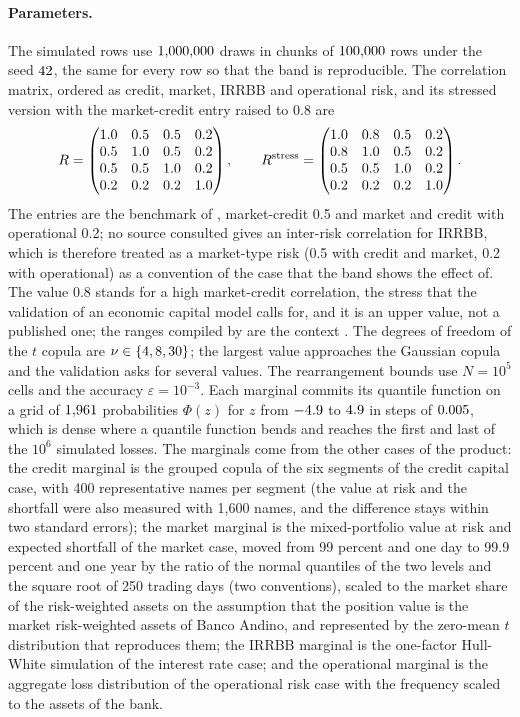 \paragraph{Parameters.}
The simulated rows use $1{,}000{,}000$ draws in chunks of $100{,}000$ rows under the seed $42$, the same for every row so
that the band is reproducible. The correlation matrix, ordered as credit, market, IRRBB and operational risk, and its stressed
version with the market-credit entry raised to 0.8 are
\begin{equation}
R=\begin{pmatrix} 1.0 & 0.5 & 0.5 & 0.2 \\ 0.5 & 1.0 & 0.5 & 0.2 \\ 0.5 & 0.5 & 1.0 & 0.2 \\ 0.2 & 0.2 & 0.2 & 1.0 \end{pmatrix},\qquad R^{\mathrm{stress}}=\begin{pmatrix} 1.0 & 0.8 & 0.5 & 0.2 \\ 0.8 & 1.0 & 0.5 & 0.2 \\ 0.5 & 0.5 & 1.0 & 0.2 \\ 0.2 & 0.2 & 0.2 & 1.0 \end{pmatrix} .
\label{eq:ag-corr}
\end{equation}
The entries are the benchmark of \citet{aggregation-stress:rosenberg2006}, market-credit 0.5 and market and credit with
operational 0.2; no source consulted gives an inter-risk correlation for IRRBB, which is therefore treated as a market-type risk
(0.5 with credit and market, 0.2 with operational) as a convention of the case that the band shows the effect of. The value
0.8 stands for a high market-credit correlation, the stress that the validation of an economic capital model calls for, and it is
an upper value, not a published one; the ranges compiled by \citet{aggregation-stress:kuritzkes2003} are the context
\citep{aggregation-stress:rosenberg2006}. The degrees of freedom of the $t$ copula are $\nu\in\{4, 8, 30\}$; the largest value
approaches the Gaussian copula and the validation asks for several values. The rearrangement bounds use $N=10^{5}$ cells and the
accuracy $\varepsilon=10^{-3}$. Each marginal commits its quantile function on a grid of $1{,}961$ probabilities
$\Phi(z)$ for $z$ from $-4.9$ to $4.9$ in steps of $0.005$, which is dense where a quantile function bends
and reaches the first and last of the $10^{6}$ simulated losses. The marginals come from the other cases of the product: the
credit marginal is the grouped copula of the six segments of the credit capital case, with 400 representative names per segment
(the value at risk and the shortfall were also measured with 1,600 names, and the difference stays within two standard errors);
the market marginal is the mixed-portfolio value at risk and expected shortfall of the market case, moved from 99 percent and one
day to 99.9 percent and one year by the ratio of the normal quantiles of the two levels and the square root of 250 trading days
(two conventions), scaled to the market share of the risk-weighted assets on the assumption that the position value is the market
risk-weighted assets of Banco Andino, and represented by the zero-mean $t$ distribution that reproduces them; the IRRBB marginal
is the one-factor Hull-White simulation of the interest rate case; and the operational marginal is the aggregate loss
distribution of the operational risk case with the frequency scaled to the assets of the bank.

